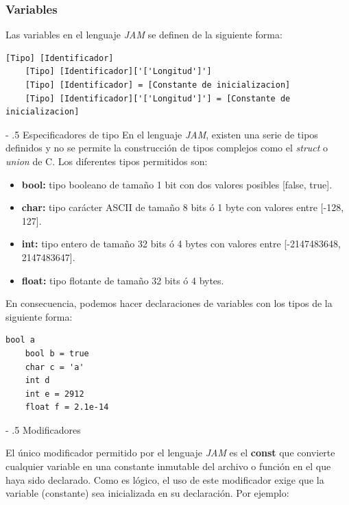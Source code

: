 \documentclass[a4paper,10pt]{article}
\makeatletter
\renewcommand\paragraph{%
   \@startsection{paragraph}{4}{0mm}%
      {-\baselineskip}%
      {.5\baselineskip}%
      {\normalfont\normalsize\bfseries}}
\makeatother
\begin{document}
\subsubsection*{Variables}
Las variables en el lenguaje \textit{JAM} se definen de la siguiente forma:

\begin{lstlisting}[language=jam]
	[Tipo] [Identificador]
	[Tipo] [Identificador]['['Longitud']']
	[Tipo] [Identificador] = [Constante de inicializacion]
	[Tipo] [Identificador]['['Longitud']'] = [Constante de inicializacion]
\end{lstlisting}
\paragraph{Especificadores de tipo}
En el lenguaje \textit{JAM}, existen una serie de tipos definidos y no se permite la construcción de tipos complejos como el \emph{struct} o \emph{union} de C. Los diferentes tipos permitidos son:

\begin{itemize}
\item \textbf{bool:} tipo booleano de tamaño 1 bit con dos valores posibles [false, true].
\item \textbf{char:} tipo carácter ASCII de tamaño 8 bits ó 1 byte con valores entre [-128, 127].
\item \textbf{int:} tipo entero de tamaño 32 bits ó 4 bytes con valores entre [-2147483648, 2147483647].
\item \textbf{float:} tipo flotante de tamaño 32 bits ó 4 bytes.
\end{itemize}

En consecuencia, podemos hacer declaraciones de variables con los tipos de la siguiente forma:

\begin{lstlisting}[language=jam]
	bool a
	bool b = true
	char c = 'a'
	int d
	int e = 2912
	float f = 2.1e-14
\end{lstlisting}
\paragraph{Modificadores}

El único modificador permitido por el lenguaje \textit{JAM} es el \textbf{const} que convierte cualquier variable en una constante inmutable del archivo o función en el que haya sido declarado. Como es lógico, el uso de este modificador exige que la variable (constante) sea inicializada en su declaración. Por ejemplo:
\end{document}
